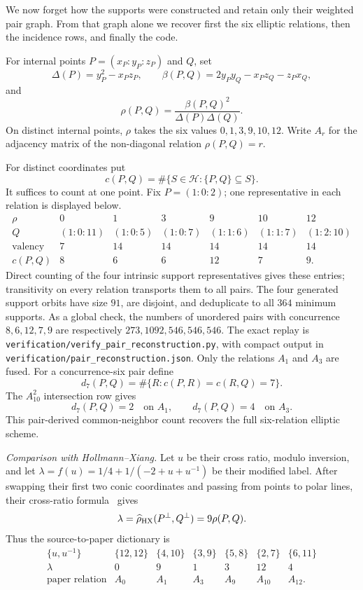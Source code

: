 \documentclass[11pt]{article}
\theoremstyle{definition}
\theoremstyle{remark}
\begin{document}
We now forget how the supports were constructed and retain only their weighted
pair graph.  From that graph alone we recover first the six elliptic relations,
then the incidence rows, and finally the code.

For internal points \(P=(x_P:y_P:z_P)\) and \(Q\), set
\[
 \Delta(P)=y_P^2-x_Pz_P,\qquad
 \beta(P,Q)=2y_Py_Q-x_Pz_Q-z_Px_Q,
\]
and
\[
 \rho(P,Q)=\frac{\beta(P,Q)^2}{\Delta(P)\Delta(Q)}.
\]
On distinct internal points, \(\rho\) takes the six values
\(0,1,3,9,10,12\).  Write \(A_r\) for the adjacency matrix of the
non-diagonal relation \(\rho(P,Q)=r\).

For distinct coordinates put
\[
 c(P,Q)=\#\{S\in\mathcal H:\{P,Q\}\subseteq S\}.
\]
It suffices to count at one point.  Fix
\(P=(1:0:2)\); one representative in each relation is displayed below.
\[
\begin{array}{c|cccccc}
\rho&0&1&3&9&10&12\\ \hline
Q&(1:0:11)&(1:0:5)&(1:0:7)&(1:1:6)&(1:1:7)&(1:2:10)\\
\text{valency}&7&14&14&14&14&14\\
c(P,Q)&8&6&6&12&7&9.
\end{array}
\]
Direct counting of the four intrinsic support representatives gives these
entries; transitivity on every relation transports them to all pairs.  The
four generated support orbits have size \(91\), are disjoint, and deduplicate
to all \(364\) minimum supports.  As a global check, the numbers of unordered
pairs with concurrence \(8,6,12,7,9\) are respectively
\(273,1092,546,546,546\).  The exact replay is
\nolinkurl{verification/verify_pair_reconstruction.py}, with compact output
in \nolinkurl{verification/pair_reconstruction.json}.
Only the relations \(A_1\) and \(A_3\) are fused.  For a concurrence-six
pair define
\[
 d_7(P,Q)=\#\{R:c(P,R)=c(R,Q)=7\}.
\]
The \(A_{10}^2\) intersection row gives
\[
 d_7(P,Q)=2\quad\text{on }A_1,
 \qquad d_7(P,Q)=4\quad\text{on }A_3.
\]
This pair-derived common-neighbor count recovers the full six-relation elliptic
scheme.

\smallskip
\noindent\emph{Comparison with Hollmann--Xiang.}
Let \(u\) be their cross ratio, modulo inversion, and let
\(\lambda=f(u)=1/4+1/(-2+u+u^{-1})\) be their modified label.  After swapping
their first two conic coordinates and passing from points to polar lines,
their cross-ratio formula~\cite[Theorem~5.3]{HollmannXiang2006} gives
\[
 \lambda=\widehat\rho_{\rm HX}(P^\perp,Q^\perp)=9\rho(P,Q).
\]
Thus the source-to-paper dictionary is
\[
\begin{array}{c|rrrrrr}
\{u,u^{-1}\}&\{12,12\}&\{4,10\}&\{3,9\}&\{5,8\}&\{2,7\}&\{6,11\}\\ \hline
\lambda&0&9&1&3&12&4\\
\text{paper relation}&A_0&A_1&A_3&A_9&A_{10}&A_{12}.
\end{array}
\]
\end{document}
